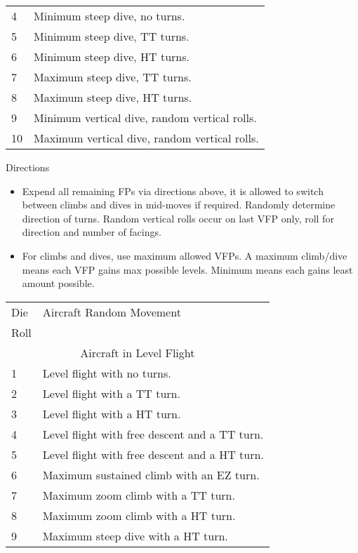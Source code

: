 \begin{onecolumntablefloat}
\begin{onecolumntable}
{\begin{tabularx}{\linewidth}{lX}
4   &Minimum steep dive, no turns.\\
5   &Minimum steep dive, TT turns.\\
6   &Minimum steep dive, HT turns.\\
7   &Maximum steep dive, TT turns.\\
8   &Maximum steep dive, HT turns.\\
9   &Minimum vertical dive, random vertical rolls.\\
10  &Maximum vertical dive, random vertical rolls.\\
\bottomrule
\end{tabularx}
\begin{tablenote}{\linewidth}
{\centering Directions\par\smallskip}

\begin{itemize}
    \item Expend all remaining FPs via directions above, it is allowed to switch between climbs and dives in mid-moves if required. Randomly determine direction of turns. Random vertical rolls occur on last VFP only, roll for direction and number of facings.
    \item For climbs and dives, use maximum allowed VFPs. A maximum climb/dive means each VFP gains max possible levels. Minimum means each gains least amount possible.
\end{itemize}
\end{tablenote}
}{
\small
\begin{tabularx}{\linewidth}{lX}
\toprule
Die&Aircraft Random Movement\\
Roll&\\
\midrule
\multicolumn{2}{c}{Aircraft in Level Flight}\\
\midrule
1   &Level flight with no turns.\\
2   &Level flight with a TT turn.\\
3   &Level flight with a HT turn.\\
4   &Level flight with free descent and a TT turn.\\
5   &Level flight with free descent and a HT turn.\\
6   &Maximum sustained climb with an EZ turn.\\
7   &Maximum zoom climb with a TT turn.\\
8   &Maximum zoom climb with a HT turn.\\
9   &Maximum steep dive with a HT turn.\\

\end{tabularx}}
\end{onecolumntable}
\end{onecolumntablefloat}
